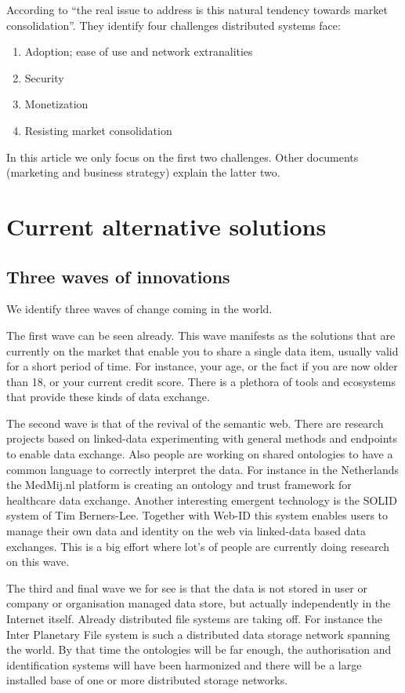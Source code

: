 \documentclass{article}
\begin{document}
According to \cite{mit_techreport} ``the real issue to address is this natural tendency towards market consolidation''. They identify four challenges distributed systems face:
\begin{enumerate}
    \item Adoption; ease of use and network extranalities
    \item Security
    \item Monetization
    \item Resisting market consolidation
\end{enumerate}
In this article we only focus on the first two challenges. Other documents (marketing and business strategy) explain the latter two.

\section{Current alternative solutions}
\subsection{Three waves of innovations}
We identify three waves of change coming in the world. 

The first wave can be seen already. This wave manifests as the solutions that are currently on the market that enable you to share a single data item, usually valid for a short period of time. For instance, your age, or the fact if you are now older than 18, or your current credit score. There is a plethora of tools and ecosystems that provide these kinds of data exchange.

The second wave is that of the revival of the semantic web. There are research projects based on linked-data experimenting with general methods and endpoints to enable data exchange. Also people are working on shared ontologies to have a common language to correctly interpret the data. For instance in the Netherlands the MedMij.nl platform is creating an ontology and trust framework for healthcare data exchange. Another interesting emergent technology is the SOLID system of Tim Berners-Lee. Together with Web-ID this system enables users to manage their own data and identity on the web via linked-data based data exchanges. This is a big effort where lot's of people are currently doing research on this wave.

The third and final wave we for see is that the data is not stored in user or company or organisation managed data store, but actually independently in the Internet itself. Already distributed file systems are taking off. For instance the Inter Planetary File system is such a distributed data storage network spanning the world. By that time the ontologies will be far enough, the authorisation and identification systems will have been harmonized and there will be a large installed base of one or more distributed storage networks.
\end{document}
